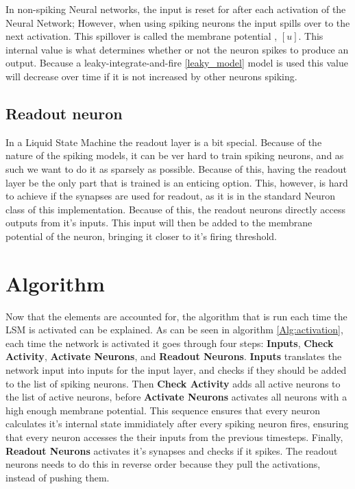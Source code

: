 In non-spiking Neural networks, the input is reset for after each activation of the Neural Network; However, when using spiking neurons the input spills over to the next activation. This spillover is called the membrane potential \cite{leaky}, $[u]$. This internal value is what determines whether or not the neuron spikes to produce an output. Because a leaky-integrate-and-fire \ref{leaky_model} model is used  this value will decrease over time if it is not increased by other neurons spiking.

\subsection{Readout neuron}

In a Liquid State Machine the readout layer is a bit special. Because of the nature of the spiking models, it can be ver hard to train spiking neurons, and as such we want to do it as sparsely as possible. Because of this, having the readout layer be the only part that is trained is an enticing option. This, however, is hard to achieve if the synapses are used for readout, as it is in the standard Neuron class of this implementation. Because of this, the readout neurons directly access outputs from it's inputs. This input will then be added to the membrane potential of the neuron, bringing it closer to it's firing threshold.

\section{Algorithm}

Now that the elements are accounted for, the algorithm that is run each time the LSM is activated can be explained. As can be seen in algorithm \ref{Alg:activation}, each time the network is activated it goes through four steps: \textbf{Inputs}, \textbf{Check Activity}, \textbf{Activate Neurons}, and \textbf{Readout Neurons}. \textbf{Inputs} translates the network input into inputs for the input layer, and checks if they should be added to the list of spiking neurons. Then \textbf{Check Activity} adds all active neurons to the list of active neurons, before \textbf{Activate Neurons} activates all neurons with a high enough membrane potential. This sequence ensures that every neuron calculates it's internal state immidiately after every spiking neuron fires, ensuring that every neuron accesses the their inputs from the previous timesteps. Finally, \textbf{Readout Neurons} activates it's synapses and checks if it spikes. The readout neurons needs to do this in reverse order because they pull the activations, instead of pushing them.

